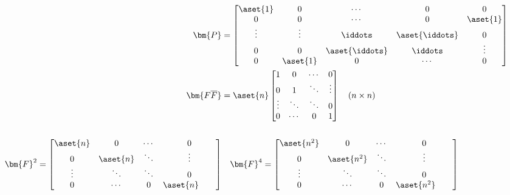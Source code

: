 \begin{itemize}
\begin{itemize}
    \begin{align*}
      \bm{P} &=
      \begin{bmatrix}
        \aset{1} & 0 & \cdots & 0 & 0\\
        0 & 0 & \cdots & 0 &\aset{1} \\
        \vdots & \vdots & \iddots & \aset{\iddots} & 0\\
        0 & 0 & \aset{\iddots} & \iddots & \vdots \\
      0 & \aset{1} & 0 & \cdots & 0 \\
      \end{bmatrix} \\
      \bm{F\overline{F}} &=
      \aset{n}
      \begin{bmatrix}
        1 & 0 & \cdots & 0 \\
        0 & 1 & \ddots & \vdots \\
        \vdots & \ddots & \ddots & 0 \\
        0 & \cdots & 0 & 1 \\
      \end{bmatrix} \quad (n \times n) \\\\
      \bm{F}^2 =
      \begin{bmatrix}
        \aset{n} & 0 & \cdots & 0 \\
        0 & \aset{n} & \ddots & \vdots \\
        \vdots & \ddots & \ddots & 0 \\
        0 & \cdots & 0 & \aset{n} \qquad
      \end{bmatrix}
                         &\quad
      \bm{F}^4 =
      \begin{bmatrix}
        \aset{n^2} & 0 & \cdots & 0 \\
        0 & \aset{n^2} & \ddots & \vdots \\
        \vdots & \ddots & \ddots & 0 \\
        0 & \cdots & 0 & \aset{n^2} \qquad
      \end{bmatrix}
    \end{align*}
  \end{itemize}



\end{itemize}
